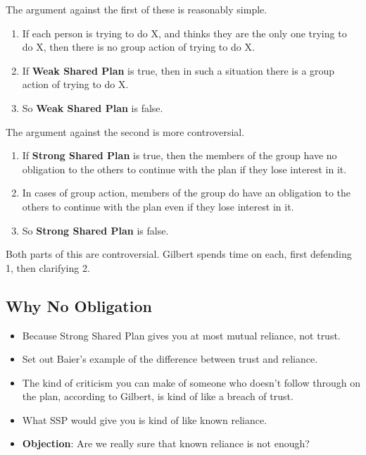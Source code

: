 \documentclass[11pt,]{article}
\providecommand{\tightlist}{%
  \setlength{\itemsep}{0pt}\setlength{\parskip}{0pt}}
\begin{document}
The argument against the first of these is reasonably simple.

\begin{enumerate}
\def\labelenumi{\arabic{enumi}.}
\tightlist
\item
  If each person is trying to do X, and thinks they are the only one
  trying to do X, then there is no group action of trying to do X.
\item
  If \textbf{Weak Shared Plan} is true, then in such a situation there
  is a group action of trying to do X.
\item
  So \textbf{Weak Shared Plan} is false.
\end{enumerate}

The argument against the second is more controversial.

\begin{enumerate}
\def\labelenumi{\arabic{enumi}.}
\tightlist
\item
  If \textbf{Strong Shared Plan} is true, then the members of the group
  have no obligation to the others to continue with the plan if they
  lose interest in it.
\item
  In cases of group action, members of the group do have an obligation
  to the others to continue with the plan even if they lose interest in
  it.
\item
  So \textbf{Strong Shared Plan} is false.
\end{enumerate}

Both parts of this are controversial. Gilbert spends time on each, first
defending 1, then clarifying 2.

\hypertarget{why-no-obligation}{%
\subsection{Why No Obligation}\label{why-no-obligation}}

\begin{itemize}
\tightlist
\item
  Because Strong Shared Plan gives you at most mutual reliance, not
  trust.
\item
  Set out Baier's example of the difference between trust and reliance.
\item
  The kind of criticism you can make of someone who doesn't follow
  through on the plan, according to Gilbert, is kind of like a breach of
  trust.
\item
  What SSP would give you is kind of like known reliance.
\item
  \textbf{Objection}: Are we really sure that known reliance is not
  enough?
\end{itemize}
\end{document}
